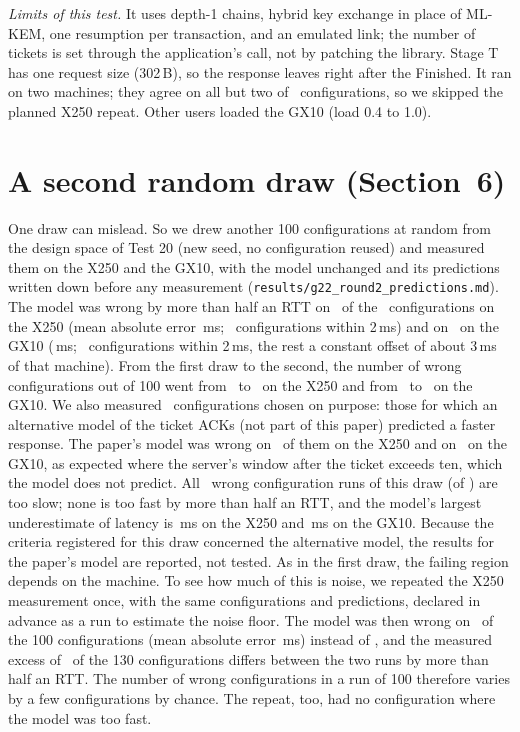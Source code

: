 \documentclass[9pt]{article}
\begin{document}
\emph{Limits of this test.} It uses depth-1 chains, hybrid key exchange in place of ML-KEM, one resumption per transaction, and an emulated link; the number of tickets is set through the application's call, not by patching the library. Stage T has one request size (302\,B), so the response leaves right after the Finished. It ran on two machines; they agree on all but two of \GtlsBothCells\ configurations, so we skipped the planned X250 repeat. Other users loaded the GX10 (load 0.4 to 1.0).

\section*{A second random draw (Section~6)}
One draw can mislead. So we drew another 100 configurations at random from the design space of Test 20 (new seed, no configuration reused) and measured them on the X250 and the GX10, with the model unchanged and its predictions written down before any measurement (\texttt{results/g22\_round2\_predictions.md}). The model was wrong by more than half an RTT on \GttXRWrong\ of the \GttXRN\ configurations on the X250 (mean absolute error \GttXRMae\,ms; \GttXRTwo\ configurations within 2\,ms) and on \GttARWrong\ on the GX10 (\GttARMae\,ms; \GttARTwo\ configurations within 2\,ms, the rest a constant offset of about 3\,ms of that machine). From the first draw to the second, the number of wrong configurations out of 100 went from \GnineCellsWrongXOne\ to \GttXRWrong\ on the X250 and from \GnineCellsWrongGx\ to \GttARWrong\ on the GX10. We also measured \GttXFN\ configurations chosen on purpose: those for which an alternative model of the ticket ACKs (not part of this paper) predicted a faster response. The paper's model was wrong on \GttXFWrong\ of them on the X250 and on \GttAFWrong\ on the GX10, as expected where the server's window after the ticket exceeds ten, which the model does not predict. All \GttDirSlow\ wrong configuration runs of this draw (of \GttDirRuns) are too slow; none is too fast by more than half an RTT, and the model's largest underestimate of latency is \GttDirMaxX\,ms on the X250 and \GttDirMaxA\,ms on the GX10. Because the criteria registered for this draw concerned the alternative model, the results for the paper's model are reported, not tested. As in the first draw, the failing region depends on the machine. To see how much of this is noise, we repeated the X250 measurement once, with the same configurations and predictions, declared in advance as a run to estimate the noise floor. The model was then wrong on \GttXRunTwoWrong\ of the 100 configurations (mean absolute error \GttXRunTwoMae\,ms) instead of \GttXRWrong, and the measured excess of \GttXNoise\ of the 130 configurations differs between the two runs by more than half an RTT. The number of wrong configurations in a run of 100 therefore varies by a few configurations by chance. The repeat, too, had no configuration where the model was too fast.
\end{document}

